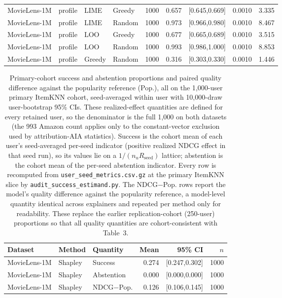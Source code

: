 \begin{table}[t]
\begin{tabular}{@{}llllrrrrr@{}}
MovieLens-1M & profile & LIME & Greedy & 1000 & 0.657 & [0.645,0.669] & 0.0010 & 3.335 \\
MovieLens-1M & profile & LIME & Random & 1000 & 0.973 & [0.966,0.980] & 0.0010 & 8.467 \\
MovieLens-1M & profile & LOO & Greedy & 1000 & 0.677 & [0.665,0.689] & 0.0010 & 3.515 \\
MovieLens-1M & profile & LOO & Random & 1000 & 0.993 & [0.986,1.000] & 0.0010 & 8.853 \\
MovieLens-1M & profile & Greedy & Random & 1000 & 0.316 & [0.303,0.330] & 0.0010 & 1.446 \\
\bottomrule
\end{tabular}
\end{table}

\begin{table}[t]\centering\scriptsize\setlength{\tabcolsep}{3pt}
\caption{Primary-cohort success and abstention proportions and paired
quality difference against the popularity reference (Pop.), all on the
1,000-user primary ItemKNN cohort, seed-averaged within user with
10,000-draw user-bootstrap 95\% CIs. These realized-effect quantities are
defined for every retained user, so the denominator is the full 1,000 on both
datasets (the 993 Amazon count applies only to the constant-vector exclusion
used by attribution-AIA statistics). Success is the cohort mean of each user's
seed-averaged per-seed indicator (positive realized NDCG effect in that seed run), so
its values lie on a $1/(n_uR_{\mathrm{seed}})$ lattice; abstention is the cohort
mean of the per-seed abstention indicator. Every row is recomputed from
\texttt{user\_seed\_metrics.csv.gz} at the primary ItemKNN slice by
\texttt{audit\_success\_estimand.py}. The NDCG$-$Pop. rows report the model's quality
difference against the popularity reference, a model-level quantity identical
across explainers and repeated per method only for readability. These replace
the earlier replication-cohort (250-user) proportions so that all quality
quantities are cohort-consistent with Table~3.}
\label{tab:prop-quality}
\begin{tabular}{@{}lllrrr@{}}
\toprule
Dataset & Method & Quantity & Mean & 95\% CI & $n$ \\
\midrule
MovieLens-1M & Shapley & Success & 0.274 & [0.247,0.302] & 1000 \\
MovieLens-1M & Shapley & Abstention & 0.000 & [0.000,0.000] & 1000 \\
MovieLens-1M & Shapley & NDCG$-$Pop. & 0.126 & [0.106,0.145] & 1000 \\

\end{tabular}
\end{table}
